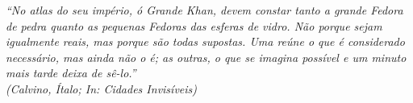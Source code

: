 \documentclass[
  12pt,        %
  openright,      %
  twoside,      %
  a4paper,      %
  english,      %
  brazil        %
]{abntex2}
\begin{document}
\begin{epigrafe}
    \vspace*{\fill}
  \begin{flushright}  
        \textit{``No atlas do seu império, ó Grande Khan, devem constar tanto a grande Fedora de pedra quanto as pequenas Fedoras das esferas de vidro. Não porque sejam igualmente reais, mas porque são todas supostas. Uma reúne o que é considerado necessário, mas ainda não o é; as outras, o que se imagina possível e um minuto mais tarde deixa de sê-lo.''\\
    (Calvino, Ítalo; In: Cidades Invisíveis)}\\%

    
  \end{flushright}
\end{epigrafe}

\end{document}
